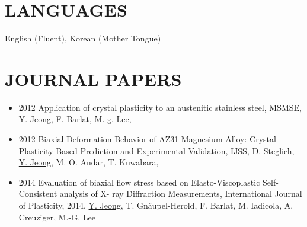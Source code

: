 \documentclass{res}
\begin{document}
\begin{resume}
  \section{LANGUAGES}
  English (Fluent), Korean (Mother Tongue)

  \section{JOURNAL PAPERS}
  \begin{itemize}
  \item 2012 Application of crystal plasticity to an austenitic stainless steel, MSMSE, \underline{Y. Jeong}, F. Barlat, M.-g. Lee, 
  \item 2012 Biaxial Deformation Behavior of AZ31 Magnesium Alloy: Crystal-Plasticity-Based Prediction and Experimental Validation, IJSS, D. Steglich, \underline{Y. Jeong}, M. O. Andar, T. Kuwabara,
  \item 2014 Evaluation of biaxial flow stress based on Elasto-Viscoplastic Self-Consistent analysis of X- ray Diffraction Measurements, International Journal of Plasticity, 2014, \underline{Y. Jeong}, T. Gn\"{a}upel-Herold, F. Barlat, M. Iadicola, A. Creuziger, M.-G. Lee
  \end{itemize}


\end{resume}
\end{document}
